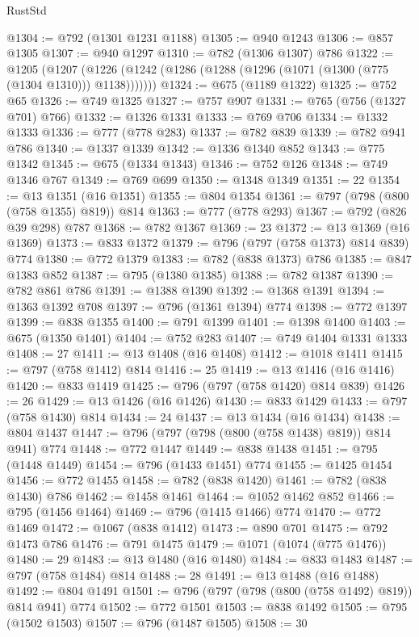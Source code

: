 \begin{lexlean}{RustStd}
\begin{coremodule}
@1304 := @792 (@1301 @1231 @1188)
@1305 := @940 @1243
@1306 := @857 @1305
@1307 := @940 @1297
@1310 := @782 (@1306 @1307) @786
@1322 := @1205
    (@1207 (@1226 (@1242 (@1286 (@1288 (@1296 (@1071 (@1300 (@775 (@1304 @1310))) @1138)))))))
@1324 := @675 (@1189 @1322)
@1325 := @752 @65
@1326 := @749 @1325
@1327 := @757 @907
@1331 := @765 (@756 (@1327 @701) @766)
@1332 := @1326 @1331
@1333 := @769 @706
@1334 := @1332 @1333
@1336 := @777 (@778 @283)
@1337 := @782 @839
@1339 := @782 @941 @786
@1340 := @1337 @1339
@1342 := @1336 @1340 @852
@1343 := @775 @1342
@1345 := @675 (@1334 @1343)
@1346 := @752 @126
@1348 := @749 @1346 @767
@1349 := @769 @699
@1350 := @1348 @1349
@1351 := 22
@1354 := @13 @1351 (@16 @1351)
@1355 := @804 @1354
@1361 := @797 (@798 (@800 (@758 @1355) @819)) @814
@1363 := @777 (@778 @293)
@1367 := @792 (@826 @39 @298) @787
@1368 := @782 @1367
@1369 := 23
@1372 := @13 @1369 (@16 @1369)
@1373 := @833 @1372
@1379 := @796 (@797 (@758 @1373) @814 @839) @774
@1380 := @772 @1379
@1383 := @782 (@838 @1373) @786
@1385 := @847 @1383 @852
@1387 := @795 (@1380 @1385)
@1388 := @782 @1387
@1390 := @782 @861 @786
@1391 := @1388 @1390
@1392 := @1368 @1391
@1394 := @1363 @1392 @708
@1397 := @796 (@1361 @1394) @774
@1398 := @772 @1397
@1399 := @838 @1355
@1400 := @791 @1399
@1401 := @1398 @1400
@1403 := @675 (@1350 @1401)
@1404 := @752 @283
@1407 := @749 @1404 @1331 @1333
@1408 := 27
@1411 := @13 @1408 (@16 @1408)
@1412 := @1018 @1411
@1415 := @797 (@758 @1412) @814
@1416 := 25
@1419 := @13 @1416 (@16 @1416)
@1420 := @833 @1419
@1425 := @796 (@797 (@758 @1420) @814 @839)
@1426 := 26
@1429 := @13 @1426 (@16 @1426)
@1430 := @833 @1429
@1433 := @797 (@758 @1430) @814
@1434 := 24
@1437 := @13 @1434 (@16 @1434)
@1438 := @804 @1437
@1447 := @796 (@797 (@798 (@800 (@758 @1438) @819)) @814 @941) @774
@1448 := @772 @1447
@1449 := @838 @1438
@1451 := @795 (@1448 @1449)
@1454 := @796 (@1433 @1451) @774
@1455 := @1425 @1454
@1456 := @772 @1455
@1458 := @782 (@838 @1420)
@1461 := @782 (@838 @1430) @786
@1462 := @1458 @1461
@1464 := @1052 @1462 @852
@1466 := @795 (@1456 @1464)
@1469 := @796 (@1415 @1466) @774
@1470 := @772 @1469
@1472 := @1067 (@838 @1412)
@1473 := @890 @701
@1475 := @792 @1473 @786
@1476 := @791 @1475
@1479 := @1071 (@1074 (@775 @1476))
@1480 := 29
@1483 := @13 @1480 (@16 @1480)
@1484 := @833 @1483
@1487 := @797 (@758 @1484) @814
@1488 := 28
@1491 := @13 @1488 (@16 @1488)
@1492 := @804 @1491
@1501 := @796 (@797 (@798 (@800 (@758 @1492) @819)) @814 @941) @774
@1502 := @772 @1501
@1503 := @838 @1492
@1505 := @795 (@1502 @1503)
@1507 := @796 (@1487 @1505)
@1508 := 30

\end{coremodule}
\end{lexlean}
